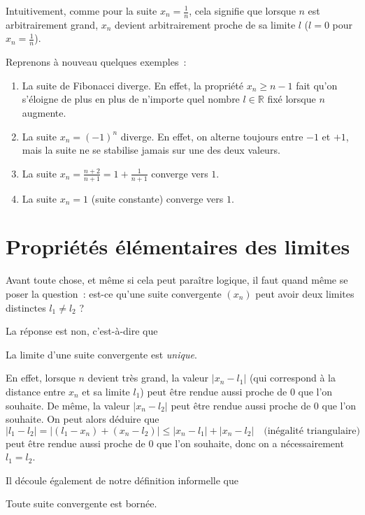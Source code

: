 Intuitivement, comme pour la suite $x_n = \frac{1}{n}$, cela signifie que lorsque $n$ est arbitrairement grand, $x_n$ devient arbitrairement proche de sa limite $l$ ($l = 0$ pour $x_n = \frac{1}{n}$). 

Reprenons à nouveau quelques exemples~:

\begin{enumerate}
    \item La suite de Fibonacci diverge. En effet, la propriété $x_n \geq n-1$ fait qu'on s'éloigne de plus en plus de n'importe quel nombre $l \in \mathbb R$ fixé lorsque $n$ augmente.
    \item La suite $x_n = (-1)^n$ diverge. En effet, on alterne toujours entre $-1$ et $+1$, mais la suite ne se stabilise jamais sur une des deux valeurs.
    \item La suite $x_n = \frac{n+2}{n+1} = 1 + \frac{1}{n+1}$ converge vers $1$.
    \item La suite $x_n = 1$ (suite constante) converge vers $1$.
\end{enumerate}

\section{Propriétés élémentaires des limites}

Avant toute chose, et même si cela peut paraître logique, il faut quand même se poser la question~: est-ce qu'une suite convergente $(x_n)$ peut avoir deux limites distinctes $l_1 \neq l_2$ ?

La réponse est non, c'est-à-dire que

\begin{boxthm}
La limite d'une suite convergente est \emph{unique}.
\end{boxthm}

En effet, lorsque $n$ devient très grand, la valeur $|x_n-l_1|$ (qui correspond à la distance entre $x_n$ et sa limite $l_1$) peut être rendue aussi proche de $0$ que l'on souhaite. De même, la valeur $|x_n-l_2|$  peut être rendue aussi proche de $0$ que l'on souhaite. On peut alors déduire que
$$|l_1 - l_2| = |(l_1 - x_n) + (x_n - l_2)| \leq |x_n - l_1| + |x_n - l_2| \quad \text{(inégalité triangulaire)}$$ peut être rendue aussi proche de $0$ que l'on souhaite, donc on a nécessairement $l_1 = l_2$.

Il découle également de notre définition informelle que 
\begin{boxthm}
Toute suite convergente est bornée.
\end{boxthm}

